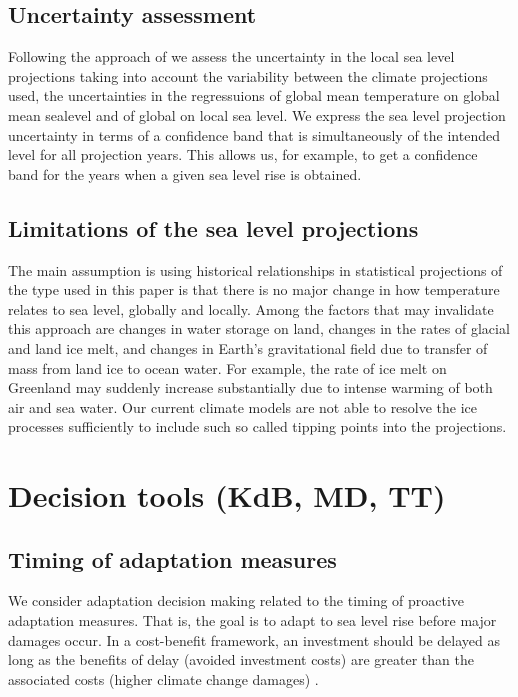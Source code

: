 \documentclass[wrr, draft]{agutex}
\begin{document}
\begin{article}
\subsection{Uncertainty assessment}
Following the approach of \citet{Guttorp2014} we assess the uncertainty in the local sea level projections taking into account the variability between the climate projections used, the uncertainties in the regressuions of global mean temperature on global mean sealevel and of global on local sea level. We express the sea level projection uncertainty in terms of a confidence band that is simultaneously of the intended  level  for all projection years. This allows us, for example, to get a confidence band for the years when a given sea level rise is obtained.


\subsection{Limitations of the sea level projections}
The main assumption is using historical relationships in statistical projections of the type used in this paper is that there is no major change in how temperature relates to sea level, globally and locally. Among the factors that may invalidate this approach are changes in water storage on land, changes in the rates of glacial and land ice melt, and changes in Earth's gravitational field due to transfer of mass from land ice to ocean water. For example, the rate of ice melt on Greenland may suddenly increase substantially due to intense warming of both air and sea water. Our current climate models are not able to resolve the ice processes sufficiently to include such so called tipping points into the projections.

\section{Decision tools {\color{blue} (KdB, MD, TT)}}

\subsection{Timing of adaptation measures}

We consider adaptation decision making related to the timing of proactive adaptation measures. That is, the goal is to adapt to sea level rise before major damages occur. In a cost-benefit framework, an investment should be delayed as long as the benefits of delay (avoided investment costs) are greater than the associated costs (higher climate change damages) \citep{Fankhauser&1999}.


\end{article}
\end{document}
